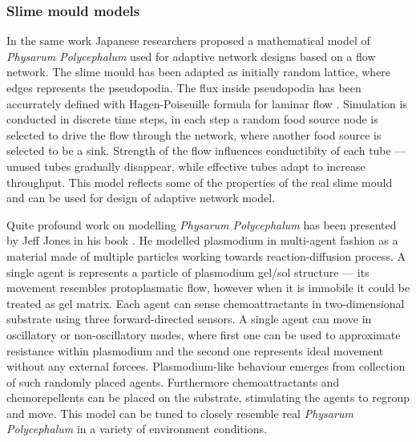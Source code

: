 \subsubsection{Slime mould models}

In the same work \cite{tero2010rules} Japanese researchers proposed a mathematical model of \textit{Physarum Polycephalum} used for adaptive network designs based on a flow network. The slime mould has been adapted as initially random lattice, where edges represents the pseudopodia. The flux inside pseudopodia has been accurrately defined with Hagen-Poiseuille formula for laminar flow \cite{sutera1993history}. Simulation is conducted in discrete time steps, in each step a random food source node is selected to drive the flow through the network, where another food source is selected to be a sink. Strength of the flow influences conductibity of each tube --- unused tubes gradually disappear, while effective tubes adapt to increase throughput. This model reflects some of the properties of the real slime mould and can be used for design of adaptive network model.

Quite profound work on modelling \textit{Physarum Polycephalum} has been presented by Jeff Jones in his book \cite{jones2015pattern}. He modelled plasmodium in multi-agent fashion as a material made of multiple particles working towards reaction-diffusion process. A single agent is represents a particle of plasmodium gel/sol structure --- its movement resembles protoplasmatic flow, however when it is immobile it could be treated as gel matrix. Each agent can sense chemoattractants in two-dimensional substrate using three forward-directed sensors. A single agent can move in oscillatory or non-oscillatory modes, where first one can be used to approximate resistance within plasmodium and the second one represents ideal movement without any external forcees. Plasmodium-like behaviour emerges from collection of such randomly placed agents. Furthermore chemoattractants and chemorepellents can be placed on the substrate, stimulating the agents to regroup and move. This model can be tuned to closely resemble real \textit{Physarum Polycephalum} in a variety of environment conditions.

